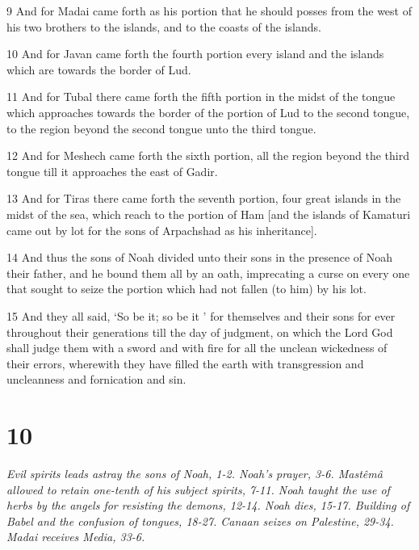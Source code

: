 \par 9 And for Madai came forth as his portion that he should posses from the west of his two brothers to the islands, and to the coasts of the islands.
\par 10 And for Javan came forth the fourth portion every island and the islands which are towards the border of Lud.
\par 11 And for Tubal there came forth the fifth portion in the midst of the tongue which approaches towards the border of the portion of Lud to the second tongue, to the region beyond the second tongue unto the third tongue.
\par 12 And for Meshech came forth the sixth portion, all the region beyond the third tongue till it approaches the east of Gadir.
\par 13 And for Tiras there came forth the seventh portion, four great islands in the midst of the sea, which reach to the portion of Ham [and the islands of Kamaturi came out by lot for the sons of Arpachshad as his inheritance].
\par 14 And thus the sons of Noah divided unto their sons in the presence of Noah their father, and he bound them all by an oath, imprecating a curse on every one that sought to seize the portion which had not fallen (to him) by his lot.
\par 15 And they all said, ‘So be it; so be it ’ for themselves and their sons for ever throughout their generations till the day of judgment, on which the Lord God shall judge them with a sword and with fire for all the unclean wickedness of their errors, wherewith they have filled the earth with transgression and uncleanness and fornication and sin.

\chapter{10}

\par \textit{Evil spirits leads astray the sons of Noah, 1-2. Noah's prayer, 3-6. Mastêmâ allowed to retain one-tenth of his subject spirits, 7-11. Noah taught the use of herbs by the angels for resisting the demons, 12-14. Noah dies, 15-17. Building of Babel and the confusion of tongues, 18-27. Canaan seizes on Palestine, 29-34. Madai receives Media, 33-6.}

